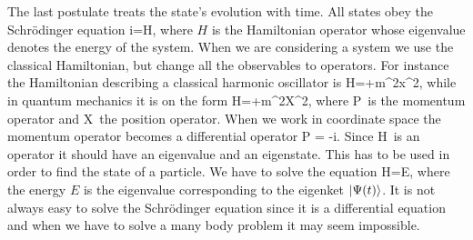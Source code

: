 The last postulate treats the state's evolution with time. All states obey the Schr\"odinger equation
\be
i\hbar{}=H,
\ee
where $H$ is the Hamiltonian operator whose eigenvalue denotes the energy of the
system. When we
are considering a system we use the classical Hamiltonian, but change all the
observables to operators. 
For instance the Hamiltonian describing a classical harmonic oscillator is
\beq
H=+m\omega^2x^2,
\eeq
while in quantum mechanics it is on the form 
\beq
H=+m\omega^2X^2,
\eeq
where \sd P\sd\, is the momentum operator and \sd X\sd \, the position
operator. When we work in coordinate space the momentum operator becomes a differential operator \sd P =
-i\hbar \nabla\sd.
Since \sd H\sd\, is an operator it should have an eigenvalue and an eigenstate. This has to be used
in order to find the state of a particle. We have to solve the equation 
\beq
H=E,
\eeq
where the energy $E$ is the eigenvalue corresponding to the eigenket $|\Psi(t)\rangle$.
It is not always easy to solve the Schr\"odinger equation since it is a differential equation and  when 
we have to solve a many body problem it may seem impossible.  
%
%

